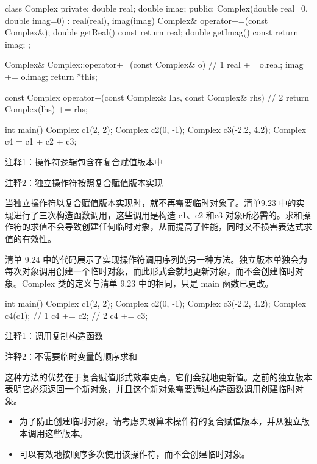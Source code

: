 
\begin{cpp}
class Complex {
private:
  double real;
  double imag;
public:
  Complex(double real=0, double imag=0) : real(real), imag(imag) {}
  Complex& operator+=(const Complex&);
  double getReal() const { return real; }
  double getImag() const { return imag; }
};

Complex& Complex::operator+=(const Complex& o) { // 1
  real += o.real;
  imag += o.imag;
  return *this;
}

const Complex operator+(const Complex& lhs, const Complex& rhs) { // 2
  return Complex(lhs) += rhs;
}

int main() {
  Complex c1(2, 2);
  Complex c2(0, -1);
  Complex c3(-2.2, 4.2);
  Complex c4 = c1 + c2 + c3;
}
\end{cpp}

{\footnotesize
注释1：操作符逻辑包含在复合赋值版本中

注释2：独立操作符按照复合赋值版本实现
}

当独立操作符以复合赋值版本实现时，就不再需要临时对象了。清单9.23 中的实现进行了三次构造函数调用，这些调用是构造 c1、c2 和c3 对象所必需的。求和操作符的求值不会导致创建任何临时对象，从而提高了性能，同时又不损害表达式求值的有效性。

清单 9.24 中的代码展示了实现操作符调用序列的另一种方法。独立版本单独会为每次对象调用创建一个临时对象，而此形式会就地更新对象，而不会创建临时对象。Complex 类的定义与清单 9.23 中的相同，只是 main 函数已更改。


\begin{cpp}
int main() {
  Complex c1(2, 2);
  Complex c2(0, -1);
  Complex c3(-2.2, 4.2);
  Complex c4(c1); // 1
  c4 += c2; // 2
  c4 += c3;
}
\end{cpp}

{\footnotesize
注释1：调用复制构造函数

注释2：不需要临时变量的顺序求和
}

这种方法的优势在于复合赋值形式效率更高，它们会就地更新值。之前的独立版本表明它必须返回一个新对象，并且这个新对象需要通过构造函数调用创建临时对象。


\begin{itemize}
\item
为了防止创建临时对象，请考虑实现算术操作符的复合赋值版本，并从独立版本调用这些版本。

\item
可以有效地按顺序多次使用该操作符，而不会创建临时对象。
\end{itemize}













